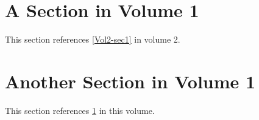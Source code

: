 \documentclass[]{article}
\begin{document}
\section{A Section in Volume 1}\label{sec1}
This section references \ref{Vol2-sec1} in volume 2.
\section{Another Section in Volume 1}
This section references \ref{sec1} in this volume.
\end{document}
